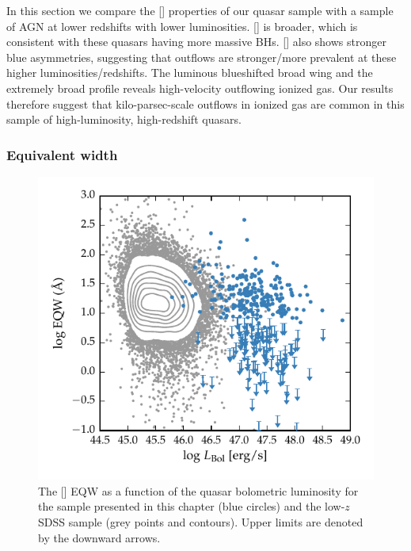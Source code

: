 In this section we compare the [] properties of our quasar sample with a sample of \ac{AGN} at lower redshifts with lower luminosities. 
[] is broader, which is consistent with these quasars having more massive \ac{BH}s. 
[] also shows stronger blue asymmetries, suggesting that outflows are stronger/more prevalent at these higher luminosities/redshifts. 
The luminous blueshifted broad wing and the extremely broad profile reveals high-velocity outflowing ionized gas. 
Our results therefore suggest that kilo-parsec-scale outflows in ionized gas are common in this sample of high-luminosity, high-redshift quasars.

\subsubsection{Equivalent width}

\begin{figure}
    \includegraphics[width=\columnwidth]{figures/chapter04/eqw_lum.pdf} 
    \caption[{The [] \ac{EQW} as a function of the quasar bolometric luminosity for the sample presented in this chapter (blue circles) and the low-$z$ \ac{SDSS} sample (grey points and contours).}]{The [] \ac{EQW} as a function of the quasar bolometric luminosity for the sample presented in this chapter (blue circles) and the low-$z$ \ac{SDSS} sample (grey points and contours). Upper limits are denoted by the downward arrows.}     
    \label{fig:eqw_lum}
\end{figure}

